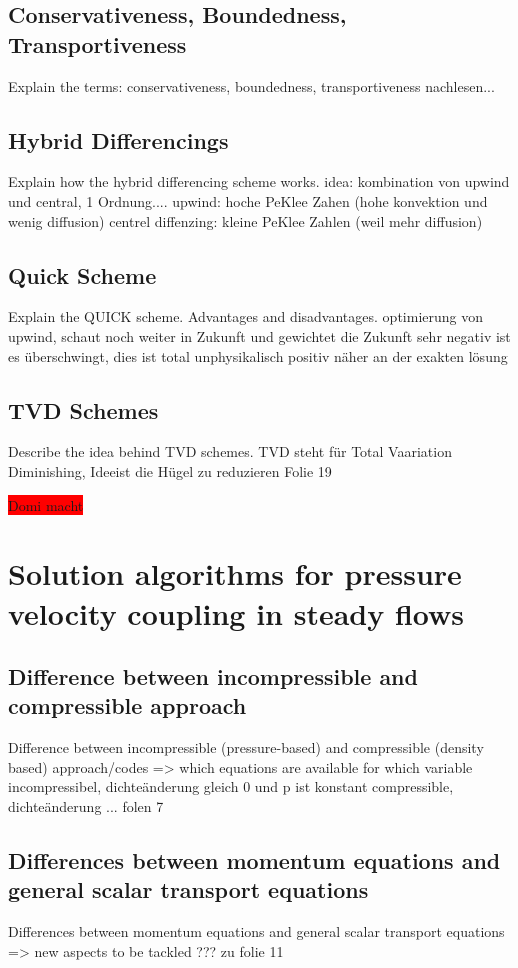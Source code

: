 \documentclass[a4paper]{scrartcl}
\begin{document}
\subsection{Conservativeness, Boundedness, Transportiveness} Explain the terms:
conservativeness, boundedness, transportiveness nachlesen...



\subsection{Hybrid Differencings} Explain how the hybrid differencing scheme
works.
idea: kombination von upwind und central, 1 Ordnung....
upwind: hoche PeKlee Zahen (hohe konvektion und wenig diffusion)
centrel diffenzing: kleine PeKlee Zahlen (weil mehr diffusion)

\subsection{Quick Scheme} Explain the QUICK scheme. Advantages and
disadvantages.
optimierung von upwind, schaut noch weiter in Zukunft und gewichtet die Zukunft
sehr negativ ist es überschwingt, dies ist total unphysikalisch
positiv näher an der exakten lösung




\subsection{TVD Schemes} Describe the idea behind TVD schemes.
TVD steht für Total Vaariation Diminishing,
Ideeist die Hügel zu reduzieren
Folie 19


\colorbox{red}{Domi macht}


\section{Solution algorithms for pressure velocity coupling in steady flows}
\subsection{Difference between incompressible and compressible approach}
Difference between incompressible (pressure-based) and compressible (density based) approach/codes => which equations are available for which variable
incompressibel, dichteänderung gleich 0 und p ist konstant
compressible, dichteänderung ...
folen 7


\subsection{Differences between momentum equations and general scalar transport
equations} 
Differences between momentum equations and general scalar transport
equations => new aspects to be tackled ??? zu folie 11
\end{document}
